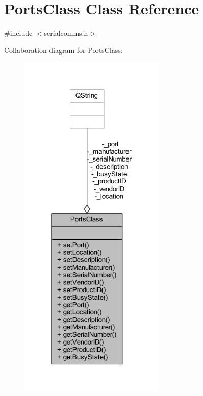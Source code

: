\hypertarget{classPortsClass}{}\section{Ports\+Class Class Reference}
\label{classPortsClass}


{\ttfamily \#include $<$serialcomms.\+h$>$}



Collaboration diagram for Ports\+Class\+:
\nopagebreak
\begin{figure}[H]
\begin{center}
\leavevmode
\includegraphics[width=198pt]{classPortsClass__coll__graph}
\end{center}
\end{figure}
